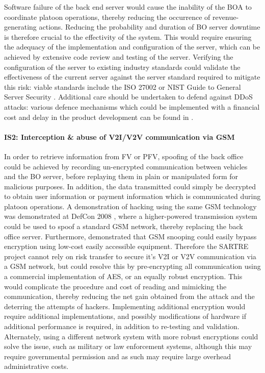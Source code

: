 \documentclass[british,11pt,a4paper]{article}
\begin{document}
Software failure of the back end server would cause the inability of the BOA to coordinate platoon operations, thereby reducing the occurrence of revenue-generating actions. Reducing the probability and duration of BO server downtime is therefore crucial to the effectivity of the system. This would require ensuring the adequacy of the implementation and configuration of the server, which can be achieved by extensive code review and testing of the server. Verifying the configuration of the server to existing industry standards could validate the effectiveness of the current server against the server standard required to mitigate this risk: viable standards include the ISO 27002 \citet{Iso2005-nn} or NIST Guide to General Server Security \citet{noauthor_undated-kw}. Additional care should be undertaken to defend against DDoS attacks: various defence mechanisms which could be implemented with a financial cost and delay in the product development can be found in \citet{Zargar2013-xx}.

\paragraph{IS2: Interception \& abuse of V2I/V2V communication via GSM \newline}
\label{par:IS2}

In order to retrieve information from FV or PFV, spoofing of the back office could be achieved by recording un-encrypted communication between vehicles and the BO server, before replaying them in plain or manipulated form for malicious purposes. In addition, the data transmitted could simply be decrypted to obtain user information or payment information which is communicated during platoon operations. A demonstration of hacking using the same GSM technology was demonstrated at DefCon 2008 \cite{Paget2010-ne}, where a higher-powered transmission system could be used to spoof a standard GSM network, thereby replacing the back office server. Furthermore, \citet{Hulton2008-jr}demonstrated that GSM snooping could easily bypass encryption using low-cost easily accessible equipment. Therefore the SARTRE project cannot rely on risk transfer to secure it’s V2I or V2V communication via a GSM network, but could resolve this by pre-encrypting all communication using a commercial implementation of AES, or an equally robust encryption. This would complicate the procedure and cost of reading and mimicking the communication, thereby reducing the net gain obtained from the attack and the deterring the attempts of hackers. Implementing additional encryption would require additional implementations, and possibly modifications of hardware if additional performance is required, in addition to re-testing and validation. Alternately, using a different network system with more robust encryptions could solve the issue, such as military or law enforcement systems, although this may require governmental permission and as such may require large overhead administrative costs. 
\end{document}
